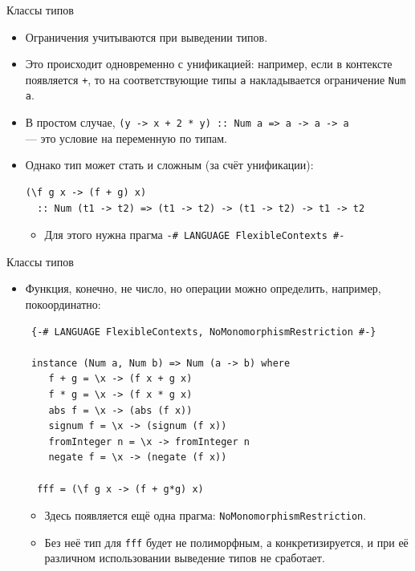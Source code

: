 \documentclass[xcolor=dvipsnames]{beamer}
\begin{document}
\begin{frame}[fragile]{Классы типов}
 
 \begin{itemize}[<+->]
  \item Ограничения учитываются при выведении типов.
  \item Это происходит одновременно с унификацией: например, если в контексте появляется \texttt{+}, то на соответствующие типы \texttt{a} накладывается ограничение \texttt{Num a}.
  \item В простом случае, \texttt{(\x y -> x + 2 * y) :: Num a => a -> a -> a} \\
  --- это условие на переменную по типам.
  \item Однако тип может стать и сложным (за счёт унификации):
  \begin{verbatim}
(\f g x -> (f + g) x)
  :: Num (t1 -> t2) => (t1 -> t2) -> (t1 -> t2) -> t1 -> t2
  \end{verbatim}
    \begin{itemize}
    \item Для этого нужна прагма 
    \texttt{{-# LANGUAGE FlexibleContexts #-}}
    \end{itemize}
 \end{itemize}

\end{frame}

\begin{frame}[fragile]{Классы типов}
 \begin{itemize}[<+->]
  \item Функция, конечно, не число, но операции можно определить, например, покоординатно:
  {\scriptsize
\begin{verbatim}
 {-# LANGUAGE FlexibleContexts, NoMonomorphismRestriction #-}
 
 instance (Num a, Num b) => Num (a -> b) where
    f + g = \x -> (f x + g x)
    f * g = \x -> (f x * g x)
    abs f = \x -> (abs (f x))
    signum f = \x -> (signum (f x))
    fromInteger n = \x -> fromInteger n
    negate f = \x -> (negate (f x))

  fff = (\f g x -> (f + g*g) x)
\end{verbatim}
  }
  \begin{itemize}
  \item Здесь появляется ещё одна прагма: \texttt{NoMonomorphismRestriction}. 
  \item Без неё тип для \texttt{fff} будет не полиморфным, а конкретизируется, и при её различном 
  использовании выведение типов не сработает. 
  \end{itemize}
 \end{itemize}

\end{frame}
\end{document}
